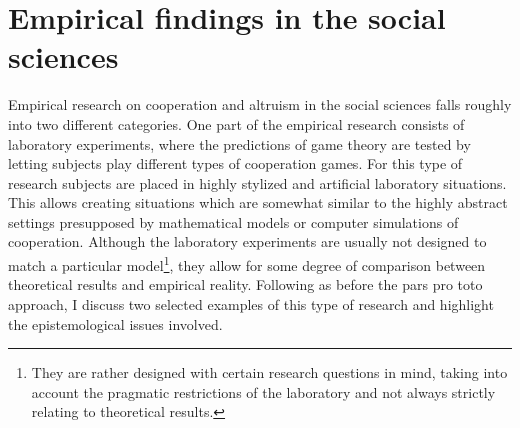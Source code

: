 \newpage

\section{Empirical findings in the social sciences}
\label{sociology}

Empirical research on cooperation and altruism in the social sciences falls
roughly into two different categories. One part of the empirical research
consists of laboratory experiments, where the predictions of game theory are
tested by letting subjects play different types of cooperation games. For this
type of research subjects are placed in highly stylized and artificial
laboratory situations. This allows creating situations which are somewhat
similar to the highly abstract settings presupposed by mathematical models or
computer simulations of cooperation. Although the laboratory experiments are
usually not designed to match a particular model\footnote{They are rather
  designed with certain research questions in mind, taking into account the
  pragmatic restrictions of the laboratory and not always strictly relating to
  theoretical results.}, they allow for some degree of comparison between
theoretical results and empirical reality. Following as before the pars pro
toto approach, I discuss two selected examples of this type of research
and highlight the epistemological issues involved.

